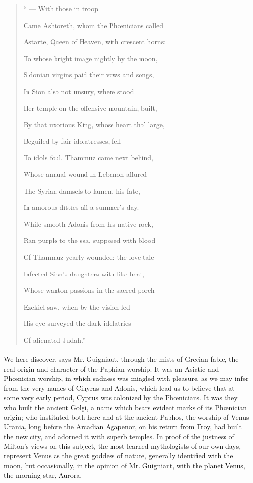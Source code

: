\documentclass[a4paper, 11pt, oneside, polutonikogreek, english]{article}
\begin{document}
\begin{quotation}\footnotesize
`` --- With those in troop

Came Ashtoreth, whom the Phœnicians called

Astarte, Queen of Heaven, with crescent horns:

To whose bright image nightly by the moon,

Sidonian virgins paid their vows and songs,

In Sion also not unsury, where stood

Her temple on the offensive mountain, built,

By that uxorious King, whose heart tho' large,

Beguiled by fair idolatresses, fell

To idols foul. Thammuz came next behind,

Whose annual wound in Lebanon allured

The Syrian damsels to lament his fate,

In amorous ditties all a summer's day.

While smooth Adonis from his native rock,

Ran purple to the sea, supposed with blood

Of Thammuz yearly wounded: the love-tale

Infected Sion's daughters with like heat,

Whose wanton passions in the sacred porch

Ezekiel saw, when by the vision led

His eye surveyed the dark idolatries

Of alienated Judah.''
\end{quotation}
\paragraph{}
We here discover, says Mr. Guigniaut, through the mists of Grecian fable, the real origin and character of the Paphian worship. It was an Asiatic and Phœnician worship, in which sadness was mingled with pleasure, as we may infer from the very names of Cinyras and Adonis, which lead us to believe that at some very early period, Cyprus was colonized by the Phœnicians. It was they who built the ancient Golgi, a name which bears evident marks of its Phœnician origin; who instituted both here and at the ancient Paphos, the worship of Venus Urania, long before the Arcadian Agapenor, on his return from Troy, had built the new city, and adorned it with superb temples. In proof of the justness of Milton's views on this subject, the most learned mythologists of our own days, represent Venus as the great goddess of nature, generally identified with the moon, but occasionally, in the opinion of Mr. Guigniaut, with the planet Venus, the morning star, Aurora.
\end{document}

